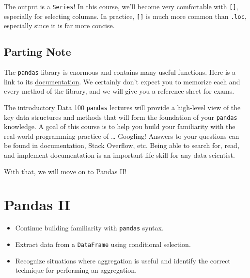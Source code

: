 \documentclass[
  letterpaper,
  DIV=11,
  numbers=noendperiod]{scrreprt}
\providecommand{\tightlist}{%
  \setlength{\itemsep}{0pt}\setlength{\parskip}{0pt}}\usepackage{longtable,booktabs,array}
\begin{document}
The output is a \texttt{Series}! In this course, we'll become very
comfortable with \texttt{{[}{]}}, especially for selecting columns. In
practice, \texttt{{[}{]}} is much more common than \texttt{.loc},
especially since it is far more concise.

\hypertarget{parting-note}{%
\section{Parting Note}\label{parting-note}}

The \texttt{pandas} library is enormous and contains many useful
functions. Here is a link to its
\href{https://pandas.pydata.org/docs/}{documentation}. We certainly
don't expect you to memorize each and every method of the library, and
we will give you a reference sheet for exams.

The introductory Data 100 \texttt{pandas} lectures will provide a
high-level view of the key data structures and methods that will form
the foundation of your \texttt{pandas} knowledge. A goal of this course
is to help you build your familiarity with the real-world programming
practice of \ldots{} Googling! Answers to your questions can be found in
documentation, Stack Overflow, etc. Being able to search for, read, and
implement documentation is an important life skill for any data
scientist.

With that, we will move on to Pandas II!


\hypertarget{pandas-ii}{%
\chapter{Pandas II}\label{pandas-ii}}

\begin{tcolorbox}[enhanced jigsaw, colback=white, opacityback=0, coltitle=black, title=\textcolor{quarto-callout-note-color}{\faInfo}\hspace{0.5em}{Learning Outcomes}, bottomtitle=1mm, breakable, titlerule=0mm, left=2mm, colbacktitle=quarto-callout-note-color!10!white, toptitle=1mm, arc=.35mm, bottomrule=.15mm, leftrule=.75mm, rightrule=.15mm, toprule=.15mm, opacitybacktitle=0.6, colframe=quarto-callout-note-color-frame]

\begin{itemize}
\tightlist
\item
  Continue building familiarity with \texttt{pandas} syntax.
\item
  Extract data from a \texttt{DataFrame} using conditional selection.
\item
  Recognize situations where aggregation is useful and identify the
  correct technique for performing an aggregation.
\end{itemize}

\end{tcolorbox}
\end{document}
